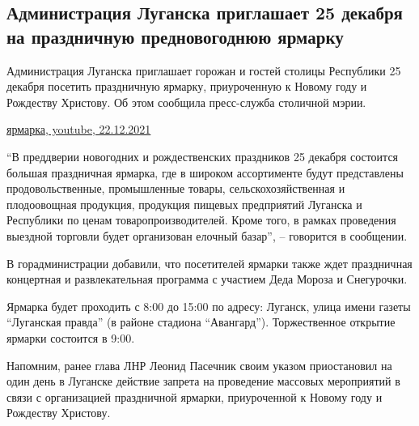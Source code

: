  
 
 
 
 
\subsection{Администрация Луганска приглашает 25 декабря на праздничную предновогоднюю ярмарку}
\label{sec:22_12_2021.stz.news.lnr.lug_info.2.jarmarka_lugansk}


Администрация Луганска приглашает горожан и гостей столицы Республики 25
декабря посетить праздничную ярмарку, приуроченную к Новому году и Рождеству
Христову. Об этом сообщила пресс-служба столичной мэрии.

\href{https://www.youtube.com/watch?v=rrtyIzE2t_Y}{ярмарка, youtube, 22.12.2021}


\enquote{В преддверии новогодних и рождественских праздников 25 декабря состоится
большая праздничная ярмарка, где в широком ассортименте будут представлены
продовольственные, промышленные товары, сельскохозяйственная и плодоовощная
продукция, продукция пищевых предприятий Луганска и Республики по ценам
товаропроизводителей. Кроме того, в рамках проведения выездной торговли будет
организован елочный базар}, – говорится в сообщении.


В горадминистрации добавили, что посетителей ярмарки также ждет праздничная
концертная и развлекательная программа с участием Деда Мороза и Снегурочки.


Ярмарка будет проходить с 8:00 до 15:00 по адресу: Луганск, улица имени газеты
\enquote{Луганская правда} (в районе стадиона \enquote{Авангард}). Торжественное открытие
ярмарки состоится в 9:00.


Напомним, ранее глава ЛНР Леонид Пасечник своим указом приостановил на один
день в Луганске действие запрета на проведение массовых мероприятий в связи с
организацией праздничной ярмарки, приуроченной к Новому году и Рождеству
Христову. 

